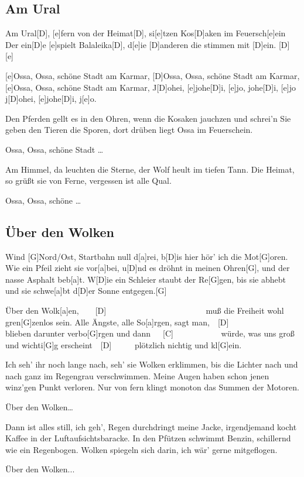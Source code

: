\documentclass[10pt,a5paper,twoside]{scrbook}
\begin{document}
\subsection{Am Ural}
\begin{guitar}
[e]Am Ural[D], [e]fern von der Heimat[D], si[e]tzen Kos[D]aken im Feuersch[e]ein
Der ein[D]e [e]spielt Balaleika[D], d[e]ie [D]anderen die stimmen mit [D]ein. [D]  [e]
	
[e]Ossa, Ossa, schöne Stadt am Karmar,
[D]Ossa, Ossa, schöne Stadt am Karmar,
[e]Ossa, Ossa, schöne Stadt am Karmar,
J[D]ohei, [e]johe[D]i, [e]jo, johe[D]i, [e]jo j[D]ohei, [e]johe[D]i, j[e]o.

Den Pferden gellt es in den Ohren, wenn die Kosaken jauchzen und schrei'n
Sie geben den Tieren die Sporen,
dort drüben liegt Ossa im Feuerschein.

Ossa, Ossa, schöne Stadt \ldots

Am Himmel, da leuchten die Sterne, der Wolf heult im tiefen Tann.
Die Heimat, so grüßt sie von Ferne,
vergessen ist alle Qual. 

Ossa, Ossa, schöne \ldots
\end{guitar}

  	  
\newpage  
  	

\subsection{Über den Wolken}
\begin{guitar}
Wind [G]Nord/Ost, Startbahn null d[a]rei, b[D]is hier hör' ich die Mot[G]oren.
Wie ein Pfeil zieht sie vor[a]bei, u[D]nd es dröhnt in meinen Ohren[G],
und der nasse Asphalt beb[a]t. W[D]ie ein Schleier staubt der Re[G]gen,
bis sie abhebt und sie schwe[a]bt d[D]er Sonne entgegen.[G]



Über den Wolk[a]en,~~~~[D] ~~~~~~~~~~~~~~~~~~~~~~~
muß die Freiheit wohl gren[G]zenlos sein.
Alle Ängste, alle So[a]rgen, sagt man,~~[D]~~~~~~~~~~~
blieben darunter verbo[G]rgen und dann~~~[C]~~~~~~~~~~~
würde, was uns groß und wichti[G]g erscheint~~[D]~~~~~
plötzlich nichtig und kl[G]ein.


Ich seh' ihr noch lange nach, seh' sie Wolken erklimmen,
bis die Lichter nach und nach ganz im Regengrau verschwimmen.
Meine Augen haben schon jenen winz'gen Punkt verloren.
Nur von fern klingt monoton das Summen der Motoren.


     Über den Wolken\ldots


Dann ist alles still, ich geh', Regen durchdringt meine Jacke,
irgendjemand kocht Kaffee in der Luftaufsichtsbaracke.
In den Pfützen schwimmt Benzin, schillernd wie ein Regenbogen.
Wolken spiegeln sich darin, ich wär' gerne mitgeflogen.


     Über den Wolken...

\end{guitar}
\end{document}
